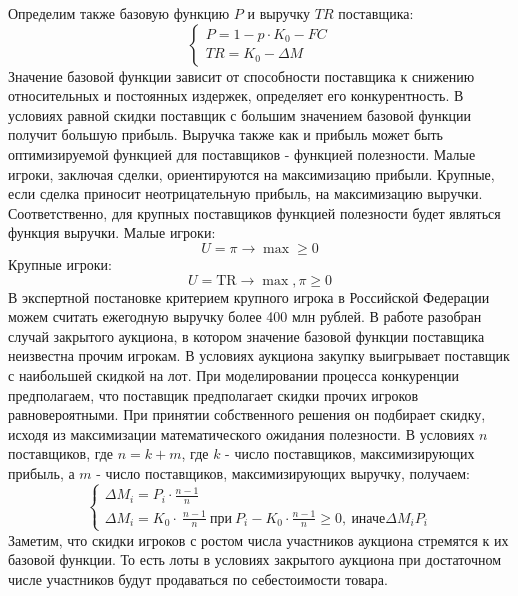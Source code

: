 Определим также базовую функцию $P$ и выручку $TR$ поставщика: 
\begin{equation}
    \begin{cases}
        P=1-p \cdot K_0 -FC  \\
        TR=K_0- \Delta M 
    \end{cases}
\end{equation}
Значение базовой функции зависит от способности поставщика к снижению относительных и постоянных издержек, определяет его конкурентность. В условиях равной скидки поставщик с большим значением базовой функции получит большую прибыль.
Выручка также как и прибыль может быть оптимизируемой функцией для поставщиков - функцией полезности. Малые игроки, заключая сделки, ориентируются на максимизацию прибыли. Крупные, если сделка приносит неотрицательную прибыль, на максимизацию выручки. Соответственно, для крупных поставщиков функцией полезности будет являться функция выручки.
Малые игроки:
\begin{equation}
    U= \pi \rightarrow \max \ge 0
\end{equation}
Крупные игроки: 
\begin{equation}
    U = \text{TR} \rightarrow \max , \pi \ge 0
\end{equation}
В экспертной постановке критерием крупного игрока в Российской Федерации можем считать ежегодную выручку более 400 млн рублей.
В работе \cite{Bogdanov2023} разобран случай закрытого аукциона, в котором значение базовой функции поставщика неизвестна прочим игрокам. В условиях аукциона закупку выигрывает поставщик с наибольшей скидкой на лот. 
При моделировании процесса конкуренции предполагаем, что поставщик предполагает скидки прочих игроков равновероятными. При принятии собственного решения он подбирает скидку, исходя из максимизации математического ожидания полезности. В условиях $n$ поставщиков, где $n=k+m$, где $k$ - число поставщиков, максимизирующих прибыль, а $m$ - число поставщиков, максимизирующих выручку, получаем:
\begin{equation}
    \begin{cases}
        \Delta M_i = P_i \cdot \frac{n-1}{n} \\
        \Delta M_i = K_0 \cdotp \ \frac{n-1}{n} \ \text{при} \ P_i- K_0 \cdotp \frac{n-1}{n} \ge 0, \ \text{иначе} \Delta M_i  P_i 
    \end{cases}
\end{equation}
Заметим, что скидки игроков с ростом числа участников аукциона стремятся к их базовой функции. То есть лоты в условиях закрытого аукциона при достаточном числе участников будут продаваться по себестоимости товара. 
